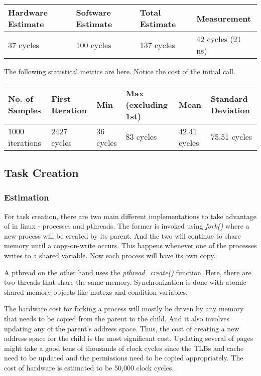 \documentclass[paper=a4, fontsize=11pt]{scrartcl}
\numberwithin{equation}{section}        %
\numberwithin{figure}{section}          %
\numberwithin{table}{section}               %
\begin{document}
\begin{center}
    \begin{tabular}{ | l | l | l | l |}
    \hline
    Hardware Estimate & Software Estimate & Total Estimate & Measurement \\ \hline
    37 cycles & 100 cycles & 137 cycles & 42 cycles (21 ns) \\ 
    \hline
    \end{tabular}
\end{center}

The following statistical metrics are here.  Notice the cost of the initial call.

\begin{center}
    \begin{tabular}{ | l | l | l | l | l | l |}
    \hline
    No. of Samples & First Iteration & Min & Max (excluding 1st) & Mean & Standard Deviation \\ \hline
    1000 iterations & 2427 cycles & 36 cycles & 83 cycles & 42.41 cycles & 75.51 cycles \\ 
    \hline
    \end{tabular}
\end{center}


\subsection{Task Creation}

\subsubsection{Estimation}

For task creation, there are two main different implementations to take advantage of in linux - processes and pthreads.  The former is invoked using \textit{fork()} where a new process will be created by its parent.  And the two will continue to share memory until a copy-on-write occurs.  This happens whenever one of the processes writes to a shared variable.  Now each process will have its own copy.

A pthread on the other hand uses the \textit{pthread\_create()} function.  Here, there are two threads that share the same memory.  Synchronization is done with atomic shared memory objects like mutexs and condition variables.

The hardware cost for forking a process will mostly be driven by any memory that needs to be copied from the parent to the child.  And it also involves updating any of the parent's address space.  Thus, the cost of creating a new address space for the child is the most significant cost.  Updating several of pages might take a good tens of thousands of clock cycles since the TLBs and cache need to be updated and the permissions need to be copied appropriately.  The cost of hardware is estimated to be 50,000 clock cycles.
\end{document}

